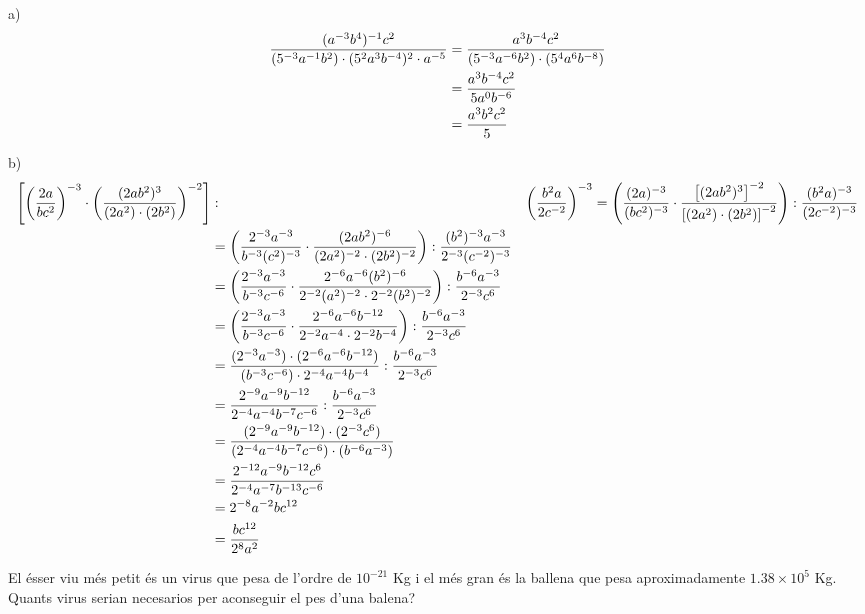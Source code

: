 \begin{solucio}
a)%
\begin{align*}
\frac{(a^{-3}b^{4})^{-1}c^{2}}{(5^{-3}a^{-1}b^{2})\cdot
(5^{2}a^{3}b^{-4})^{2}\cdot a^{-5}} &=\frac{a^{3}b^{-4}c^{2}}{%
(5^{-3}a^{-6}b^{2})\cdot (5^{4}a^{6}b^{-8})} \\
&=\frac{a^{3}b^{-4}c^{2}}{5a^{0}b^{-6}} \\
&=\frac{a^{3}b^{2}c^{2}}{5}
\end{align*}

b)%
\begin{align*}
\left[ \left( \frac{2a}{bc^{2}}\right) ^{-3}\cdot \left( \frac{(2ab^{2})^{3}%
}{(2a^{2})\cdot (2b^{2})}\right) ^{-2}\right] &:&\left( \frac{b^{2}a}{2c^{-2}%
}\right) ^{-3}=\left( \frac{(2a)^{-3}}{(bc^{2})^{-3}}\cdot \frac{\left[
(2ab^{2})^{3}\right] ^{-2}}{\left[ (2a^{2})\cdot (2b^{2})\right] ^{-2}}%
\right) :\frac{(b^{2}a)^{-3}}{(2c^{-2})^{-3}} \\
&=\left( \frac{2^{-3}a^{-3}}{b^{-3}(c^{2})^{-3}}\cdot \frac{(2ab^{2})^{-6}}{%
(2a^{2})^{-2}\cdot (2b^{2})^{-2}}\right) :\frac{(b^{2})^{-3}a^{-3}}{%
2^{-3}(c^{-2})^{-3}} \\
&=\left( \frac{2^{-3}a^{-3}}{b^{-3}c^{-6}}\cdot \frac{%
2^{-6}a^{-6}(b^{2})^{-6}}{2^{-2}(a^{2})^{-2}\cdot 2^{-2}(b^{2})^{-2}}\right)
:\frac{b^{-6}a^{-3}}{2^{-3}c^{6}} \\
&=\left( \frac{2^{-3}a^{-3}}{b^{-3}c^{-6}}\cdot \frac{2^{-6}a^{-6}b^{-12}}{%
2^{-2}a^{-4}\cdot 2^{-2}b^{-4}}\right) :\frac{b^{-6}a^{-3}}{2^{-3}c^{6}} \\
&=\frac{(2^{-3}a^{-3})\cdot (2^{-6}a^{-6}b^{-12})}{(b^{-3}c^{-6})\cdot
2^{-4}a^{-4}b^{-4}}:\frac{b^{-6}a^{-3}}{2^{-3}c^{6}} \\
&=\frac{2^{-9}a^{-9}b^{-12}}{2^{-4}a^{-4}b^{-7}c^{-6}}:\frac{b^{-6}a^{-3}}{%
2^{-3}c^{6}} \\
&=\frac{(2^{-9}a^{-9}b^{-12})\cdot (2^{-3}c^{6})}{%
(2^{-4}a^{-4}b^{-7}c^{-6})\cdot (b^{-6}a^{-3})} \\
&=\frac{2^{-12}a^{-9}b^{-12}c^{6}}{2^{-4}a^{-7}b^{-13}c^{-6}} \\
&=2^{-8}a^{-2}bc^{12} \\
&=\frac{bc^{12}}{2^{8}a^{2}}
\end{align*}
\end{solucio}

\begin{exercici}
El ésser viu més petit és un virus que pesa de l’ordre de $10^{-21}$
Kg i el més gran és la ballena que pesa aproximadamente $1.38\times
10^{5}$ Kg. Quants virus serian necesarios per
aconseguir el pes d’una balena?

\end{exercici}

